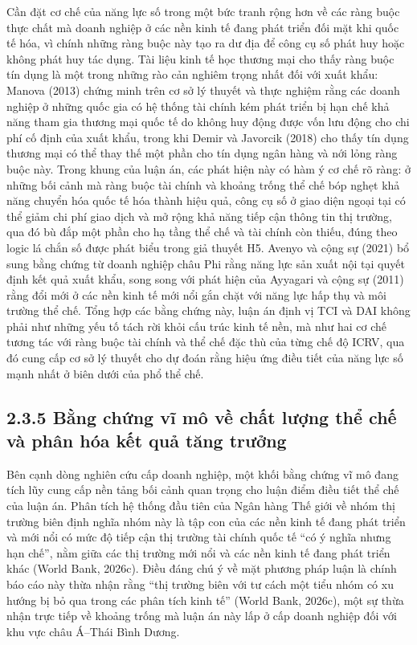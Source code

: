 \documentclass[
  a4paper,
  13pt]{extreport}
\begin{document}
Cần đặt cơ chế của năng lực số trong một bức tranh rộng hơn về các ràng
buộc thực chất mà doanh nghiệp ở các nền kinh tế đang phát triển đối mặt
khi quốc tế hóa, vì chính những ràng buộc này tạo ra dư địa để công cụ
số phát huy hoặc không phát huy tác dụng. Tài liệu kinh tế học thương
mại cho thấy ràng buộc tín dụng là một trong những rào cản nghiêm trọng
nhất đối với xuất khẩu: Manova (2013) chứng minh trên cơ sở lý thuyết và
thực nghiệm rằng các doanh nghiệp ở những quốc gia có hệ thống tài chính
kém phát triển bị hạn chế khả năng tham gia thương mại quốc tế do không
huy động được vốn lưu động cho chi phí cố định của xuất khẩu, trong khi
Demir và Javorcik (2018) cho thấy tín dụng thương mại có thể thay thế
một phần cho tín dụng ngân hàng và nới lỏng ràng buộc này. Trong khung
của luận án, các phát hiện này có hàm ý cơ chế rõ ràng: ở những bối cảnh
mà ràng buộc tài chính và khoảng trống thể chế bóp nghẹt khả năng chuyển
hóa quốc tế hóa thành hiệu quả, công cụ số ở giao diện ngoại tại có thể
giảm chi phí giao dịch và mở rộng khả năng tiếp cận thông tin thị
trường, qua đó bù đắp một phần cho hạ tầng thể chế và tài chính còn
thiếu, đúng theo logic lá chắn số được phát biểu trong giả thuyết H5.
Avenyo và cộng sự (2021) bổ sung bằng chứng từ doanh nghiệp châu Phi
rằng năng lực sản xuất nội tại quyết định kết quả xuất khẩu, song song
với phát hiện của Ayyagari và cộng sự (2011) rằng đổi mới ở các nền kinh
tế mới nổi gắn chặt với năng lực hấp thụ và môi trường thể chế. Tổng hợp
các bằng chứng này, luận án định vị TCI và DAI không phải như những yếu
tố tách rời khỏi cấu trúc kinh tế nền, mà như hai cơ chế tương tác với
ràng buộc tài chính và thể chế đặc thù của từng chế độ ICRV, qua đó cung
cấp cơ sở lý thuyết cho dự đoán rằng hiệu ứng điều tiết của năng lực số
mạnh nhất ở biên dưới của phổ thể chế.

\hypertarget{bux1eb1ng-chux1ee9ng-vux129-muxf4-vux1ec1-chux1ea5t-lux1b0ux1ee3ng-thux1ec3-chux1ebf-vuxe0-phuxe2n-huxf3a-kux1ebft-quux1ea3-tux103ng-trux1b0ux1edfng}{%
\subsection{2.3.5 Bằng chứng vĩ mô về chất lượng thể chế và phân hóa kết
quả tăng
trưởng}\label{bux1eb1ng-chux1ee9ng-vux129-muxf4-vux1ec1-chux1ea5t-lux1b0ux1ee3ng-thux1ec3-chux1ebf-vuxe0-phuxe2n-huxf3a-kux1ebft-quux1ea3-tux103ng-trux1b0ux1edfng}}

Bên cạnh dòng nghiên cứu cấp doanh nghiệp, một khối bằng chứng vĩ mô
đang tích lũy cung cấp nền tảng bối cảnh quan trọng cho luận điểm điều
tiết thể chế của luận án. Phân tích hệ thống đầu tiên của Ngân hàng Thế
giới về nhóm thị trường biên định nghĩa nhóm này là tập con của các nền
kinh tế đang phát triển và mới nổi có mức độ tiếp cận thị trường tài
chính quốc tế ``có ý nghĩa nhưng hạn chế'', nằm giữa các thị trường mới
nổi và các nền kinh tế đang phát triển khác (World Bank, 2026c). Điều
đáng chú ý về mặt phương pháp luận là chính báo cáo này thừa nhận rằng
``thị trường biên với tư cách một tiểu nhóm có xu hướng bị bỏ qua trong
các phân tích kinh tế'' (World Bank, 2026c), một sự thừa nhận trực tiếp
về khoảng trống mà luận án này lấp ở cấp doanh nghiệp đối với khu vực
châu Á--Thái Bình Dương.
\end{document}
